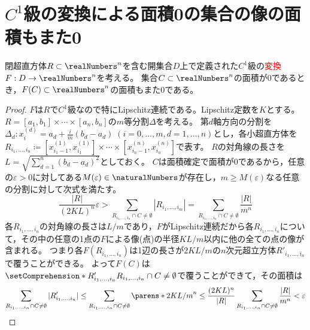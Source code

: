    \section{\texorpdfstring{$C^1$}{C\string^1}級の変換による面積0の集合の像の面積もまた0}
        \begin{shadebox}
            閉超直方体$R\subset\realNumbers^n$を含む開集合$D$上で定義された$C^1$級の\textcolor{red}{変換}$F:D\to\realNumbers^n$を考える。
            集合$C\subset\realNumbers^n$の面積が0であるとき，$F(C)\subset\realNumbers^n$の面積もまた0である。
        \end{shadebox}
        \begin{proof}
            $F$は$R$で$C^1$級なので特にLipschitz連続である。Lipschitz定数を$K$とする。
            $R = [a_1,b_1]\times\dotsb\times[a_n,b_n]$の$m$等分割$\Delta$を考える。
            第$d$軸方向の分割を$\Delta_d: x^{(d)}_i = a_d + \frac{i}{m}(b_d-a_d)\;(i=0,\dotsc,m,d=1,\dotsc,n)$とし，各小超直方体を$R_{i_1,\dotsc,i_n} \coloneq [x^{(1)}_{i_1-1}, x^{(1)}_{i_1}]\times\dotsb\times[x^{(n)}_{i_n-1}, x^{(n)}_{i_n}]$で表す。
            $R$の対角線の長さを$L = \sqrt{\sum_{d=1}^n (b_d-a_d)^2}$としておく。
            $C$は面積確定で面積が0であるから，任意の$\varepsilon>0$に対してある$M(\varepsilon)\in\naturalNumbers$が存在し，$m\geq M(\varepsilon)$なる任意の分割に対して次式を満たす。
            \[ \frac{|R|}{(2KL)^n}\varepsilon > \sum_{R_{i_1,\dotsc,i_n}\cap C\neq \emptyset} |R_{i_1,\dotsc,i_m}| = \sum_{R_{i_1,\dotsc,i_n}\cap C\neq \emptyset}\frac{|R|}{m^n} \]
            各$R_{i_1,\dotsc,i_n}$の対角線の長さは$L/m$であり，$F$がLipschitz連続だから各$R_{i_1,\dotsc,i_n}$について，その中の任意の1点の$F$による像(点)の半径$KL/m$以内に他の全ての点の像が含まれる。
            つまり各$F(R_{i_1,\dotsc,i_n})$は1辺の長さが$2KL/m$の$n$次元超立方体$R'_{i_1,\dotsc,i_n}$で覆うことができる。
            よって$F(C)$は$\setComprehension*{R'_{i_1,\dotsc,i_n}}{R_{i_1,\dotsc,i_n}\cap C\neq\emptyset}$で覆うことができて，その面積は
            \[ \sum_{R_{i_1,\dotsc,i_n}\cap C\neq\emptyset} |R'_{i_1,\dotsc,i_n}| \leq \sum_{R_{i_1,\dotsc,i_n}\cap C\neq\emptyset} \parens*{2KL/m}^n \leq \frac{(2KL)^n}{|R|}\sum_{R_{i_1,\dotsc,i_n}\cap C\neq\emptyset} \frac{|R|}{m^n} < \varepsilon\]
        \end{proof}
